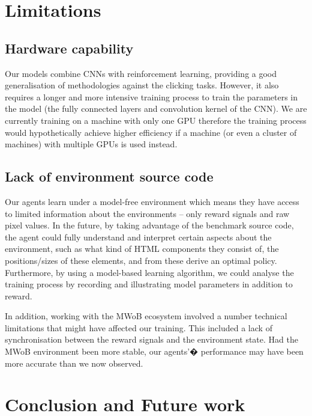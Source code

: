 \documentclass[10pt,journal,compsoc]{IEEEtran}
\begin{document}
\section{Limitations}

\subsection{Hardware capability}
Our models combine CNNs with reinforcement learning, providing a good generalisation of methodologies against the clicking tasks. However, it also requires a longer and more intensive training process to train the parameters in the model (the fully connected layers and convolution kernel of the CNN). We are currently training on a machine with only one GPU therefore the training process would hypothetically achieve higher efficiency if a machine (or even a cluster of machines) with multiple GPUs is used instead.

\subsection{Lack of environment source code}
Our agents learn under a model-free environment which means they have access to limited information about the environments -- only reward signals and raw pixel values. In the future, by taking advantage of the benchmark source code, the agent could fully understand and interpret certain aspects about the environment, such as what kind of HTML components they consist of, the positions/sizes of these elements, and from these derive an optimal policy. %
Furthermore, by using a model-based learning algorithm, we could analyse the training process by recording and illustrating model parameters in addition to reward. 

In addition, working with the MWoB ecosystem involved a number technical limitations that might have affected our training. This included a lack of synchronisation between the reward signals and the environment state. Had the MWoB environment been more stable, our agents'� performance may have been more accurate than we now observed.

\section{Conclusion and Future work}
\end{document}
